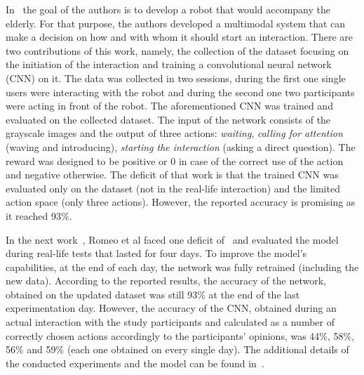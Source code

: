 \documentclass[thesis]{mas_proposal}
\begin{document}
In~\cite{Romeo2018} the goal of the authors is to develop a robot that would accompany the elderly. For that purpose, the authors developed a multimodal system that can make a decision on how and with whom it should start an interaction. There are two contributions of this work, namely, the collection of the dataset focusing on the initiation of the interaction and training a convolutional neural network (CNN) on it. The data was collected in two sessions, during the first one single users were interacting with the robot and during the second one two participants were acting in front of the robot. The aforementioned CNN was trained and evaluated on the collected dataset. The input of the network consists of the grayscale images and the output of three actions: \emph{waiting}, \emph{calling for attention} (waving and introducing), \emph{starting the interaction} (asking a direct question). The reward was designed to be positive or 0 in case of the correct use of the action and negative otherwise. The deficit of that work is that the trained CNN was evaluated only on the dataset (not in the real-life interaction) and the limited action space (only three actions). However, the reported accuracy is promising as it reached 93\%. 

In the next work~\cite{Romeo2019}, Romeo et al faced one deficit of~\cite{Romeo2018} and evaluated the model during real-life tests that lasted for four days. To improve the model's capabilities, at the end of each day, the network was fully retrained (including the new data). According to the reported results, the accuracy of the network, obtained on the updated dataset was still 93\% at the end of the last experimentation day. However, the accuracy of the CNN, obtained during an actual interaction with the study participants and calculated as a number of correctly chosen actions accordingly to the participants' opinions, was 44\%, 58\%, 56\% and 59\% (each one obtained on every single day). The additional details of the conducted experiments and the model can be found in~\cite{romeo2021human}.
\end{document}
